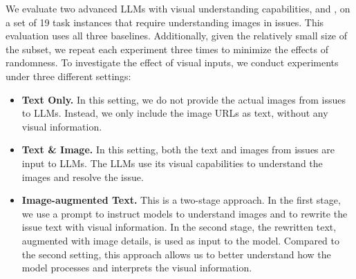 We evaluate two advanced LLMs with visual understanding capabilities, \GPT and \Claude, on a set of 19 task instances that require understanding images in issues. 
This evaluation uses all three baselines. Additionally, given the relatively small size of the subset, we repeat each experiment three times to minimize the effects of randomness. To investigate the effect of visual inputs, we conduct experiments under three different settings: 

\begin{itemize}[left=10pt]
     \item \textbf{Text Only.} In this setting, we do not provide the actual images from issues to LLMs. Instead, we only include the image URLs as text, without any visual information.


    \item \textbf{Text \& Image.} In this setting, both the text and images from issues are input to LLMs. The LLMs use its visual capabilities to understand the images and resolve the issue.
    

 \item \textbf{Image-augmented Text.} This is a two-stage approach. In the first stage, we use a prompt to instruct models to understand images and to rewrite the issue text with visual information. In the second stage, the rewritten text, augmented with image details, is used as input to the model. Compared to the second setting, this approach allows us to better understand how the model processes and interprets the visual information. 
    



\end{itemize}

